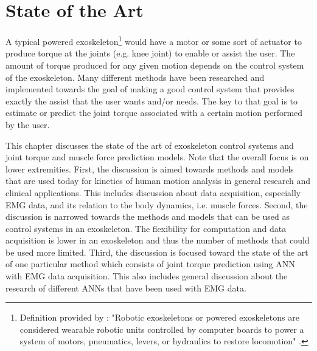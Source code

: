 \chapter{State of the Art}
A typical powered exoskeleton\footnote{Definition provided by \textcite{Gorgey2018}: "Robotic exoskeletons or powered exoskeletons are considered wearable robotic units controlled by computer boards to power a system of motors, pneumatics, levers, or hydraulics to restore locomotion" \parencite[113]{Gorgey2018}.} would have a motor or some sort of actuator to produce torque at the joints (e.g. knee joint) to enable or assist the user.
The amount of torque produced for any given motion depends on the control system of the exoskeleton.
Many different methods have been researched and implemented towards the goal of making a good control system that provides exactly the assist that the user wants and/or needs.
The key to that goal is to estimate or predict the joint torque associated with a certain motion performed by the user.

This chapter discusses the state of the art of exoskeleton control systems and joint torque and muscle force prediction models.
Note that the overall focus is on lower extremities.
First, the discussion is aimed towards methods and models that are used today for kinetics of human motion analysis in general research and clinical applications.
This includes discussion about data acquisition, especially \ac{EMG} data, and its relation to the body dynamics, i.e. muscle forces.
Second, the discussion is narrowed towards the methods and models that can be used as control systems in an exoskeleton.
The flexibility for computation and data acquisition is lower in an exoskeleton and thus the number of methods that could be used more limited.
Third, the discussion is focused toward the state of the art of one particular method which consists of joint torque prediction using \ac{ANN} with \ac{EMG} data acquisition. 
This also includes general discussion about the research of different \acp{ANN} that have been used with \ac{EMG} data.

